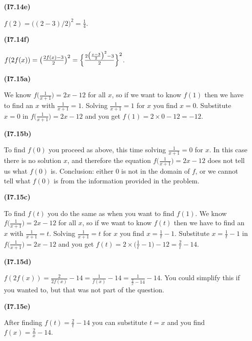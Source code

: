\documentclass[openany,reqno]{amsbook}
\begin{document}
\begin{trivlist}
  \bigskip

\item[{\bf(I7.14e)}]

  $f(2) = \bigl((2-3)/2\bigr)^2 = \frac{1}{4}$.
  \bigskip

\item[{\bf(I7.14f)}]

  $f(2f(x)) = \bigl(\frac{2f(x)-3}{2}\bigr)^2 =
  \Bigl\{\frac{2\bigl(\frac{x-3}{2}\bigr)^2 - 3}{2}\Bigr\}^2$.

  \bigskip

\item[{\bf(I7.15a)}]

  We know $f\bigl(\frac1{x+1}\bigr) = 2x-12$ for all $x$, so if we want to know
  $f(1)$ then we have to find an $x$ with $\frac{1}{x+1} = 1$.  Solving $\frac{1}{x+1} = 1$
  for $x$ you find $x=0$. Substitute $x=0$ in $f\bigl(\frac1{x+1}\bigr) = 2x-12$
  and you get $f(1) = 2\times0-12 = -12$.
  \bigskip

\item[{\bf(I7.15b)}]

  To find $f(0)$ you proceed as above, this time solving $\frac{1}{x+1} = 0$ for
  $x$.  In this case there is no solution $x$, and therefore the equation
  $f\bigl(\frac1{x+1}\bigr) = 2x-12$ does not tell us what $f(0)$ is.  Conclusion:
  either 0 is not in the domain of $f$, or we cannot tell what $f(0)$ is from
  the  information provided in the problem.
  \bigskip

\item[{\bf(I7.15c)}]

  To find $f(t)$ you do the same as when you want to find $f(1)$.
  We know $f\bigl(\frac1{x+1}\bigr) = 2x-12$ for all $x$, so if we want to know
  $f(t)$ then we have to find an $x$ with $\frac{1}{x+1} = t$.  Solving $\frac{1}{x+1} = t$
  for $x$ you find $x=\frac 1t -1$. Substitute $x=\frac 1t -1$ in $f\bigl(\frac1{x+1}\bigr) = 2x-12$
  and you get $f(t) = 2\times\bigl(\frac{1}{t}-1\bigr)-12 = \frac{2}{t} -14 $.
  \bigskip

\item[{\bf(I7.15d)}]

  $f(2f(x)) = \frac{2}{2f(x)} - 14 = \frac{1}{f(x)} - 14 =
  \frac{1}{\frac{2}{x}-14} - 14$.  You could simplify this if you wanted to, but
  that was not part of the question.
  \bigskip

\item[{\bf(I7.15e)}]

  After finding $f(t) = \frac{2}{t} -14 $ you can substitute $t=x$ and you find
  $f(x) = \frac{2}{x} -14 $.
  \bigskip


\end{trivlist}
\end{document}
